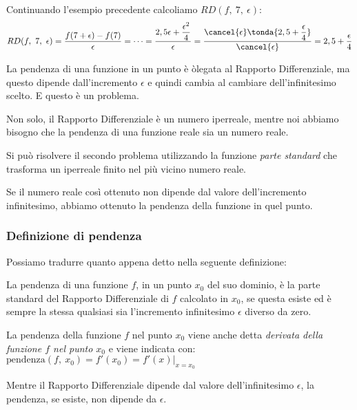 Continuando l'esempio precedente calcoliamo \(RD(f,~7,~\epsilon)\):
\[RD(f,~7,~\epsilon) =
 \frac{f(7+\epsilon) - f(7)}{\epsilon}=\dots=
 \frac{2,5 \epsilon + \dfrac{\epsilon^2}{4}}{\epsilon}=
 \frac{\cancel{\epsilon}\tonda{2,5 + \dfrac{\epsilon}{4}}}
 {\cancel{\epsilon}}=
 2,5 + \frac{\epsilon}{4}
\]

La pendenza di una funzione in un punto è òlegata al Rapporto Differenziale, 
ma questo dipende dall'incremento \(\epsilon\) e quindi cambia al cambiare 
dell'infinitesimo scelto. 
E questo è un problema. 

Non solo, il Rapporto Differenziale è un numero iperreale, mentre noi 
abbiamo bisogno che la pendenza di una funzione reale sia un numero reale.

Si può risolvere il secondo problema utilizzando la funzione 
\emph{parte standard} che trasforma un iperreale finito nel più vicino
numero reale.

Se il numero reale così ottenuto non dipende dal valore dell'incremento 
infinitesimo, abbiamo ottenuto la pendenza della funzione in quel punto.

\subsubsection{Definizione di pendenza}
Possiamo tradurre quanto appena detto nella seguente definizione: 
\begin{definizione}
La pendenza di una funzione \(f\), in un punto \(x_0\) del suo dominio, 
è la parte standard del Rapporto Differenziale di \(f\) calcolato in 
\(x_0\), se questa esiste ed è sempre la stessa qualsiasi sia 
l'incremento infinitesimo \(\epsilon\) diverso da zero.
\end{definizione}

La pendenza della funzione \(f\) nel punto \(x_0\) 
viene anche detta \emph{derivata della funzione \(f\) nel punto \(x_0\)} e 
viene indicata con: \quad 
\(\text{pendenza}(f,~x_0) = f'(x_0) = f'(x) \big|_{x=x_0}\)

\begin{osservazione}
Mentre il Rapporto Differenziale dipende dal valore dell'infinitesimo 
\(\epsilon\), la pendenza, se esiste, non dipende da \(\epsilon\).
\end{osservazione}

